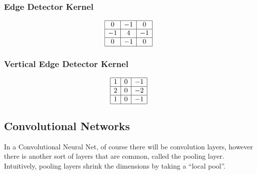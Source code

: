 \documentclass[11pt]{article}
\begin{document}
\subsubsection{Edge Detector Kernel}
\begin{equation}
    \begin{array}{|c|c|c|}
        \hline 0 & {-1} & {0} \\
        \hline-1 & {4} & {-1} \\
        \hline 0 & {-1} & {0} \\
        \hline
    \end{array}
\end{equation}

\subsubsection{Vertical Edge Detector Kernel}
    \begin{equation}
        \begin{array}{|c|c|c|}
        \hline 1 & {0} & {-1} \\
        \hline 2 & {0} & {-2} \\
        \hline 1 & {0} & {-1} \\
        \hline
    \end{array}
\end{equation}

\subsection{Convolutional Networks}
In a Convolutional Neural Net, of course there will be convolution layers, however there is another sort of layers that are common, called the pooling layer. Intuitively, pooling layers shrink the dimensions by taking a ``local pool''.
\end{document}

